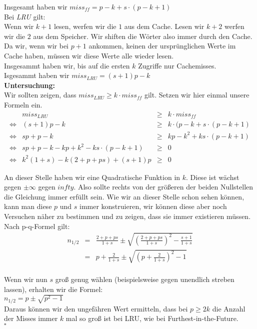 \documentclass[11pt,a4paper,ngerman]{article}
\begin{document}
\begin{enumerate}[\bfseries (a)]
Insgesamt haben wir $miss_{ff} = p - k + s \cdot (p - k + 1)$ \\

Bei \emph{LRU} gilt:\\
Wenn wir $k+1$ lesen, werfen wir die $1$ aus dem Cache. Lesen wir $k+2$ werfen wir die $2$ aus dem Speicher. Wir shiften die Wörter also immer durch den Cache. Da wir, wenn wir bei $p+1$ ankommen, keinen der ursprünglichen Werte im Cache haben, müssen wir diese Werte alle wieder lesen.\\
Insgesammt haben wir, bis auf die ersten $k$ Zugriffe nur Cachemisses.\\

Isgesammt haben wir $miss_{LRU} = (s+1)p - k$\\

\textbf{Untersuchung:}\\
Wir sollten zeigen, dass $miss_{LRU} \geq k \cdot miss_{ff}$ gilt. Setzen wir hier einmal unsere Formeln ein.
$$
\begin{array}{crcl}
& miss_{LRU} &\geq& k \cdot miss_{ff}\\
\Leftrightarrow & (s+1)p - k &\geq& k \cdot (p - k + s \cdot (p - k + 1)\\
\Leftrightarrow & sp + p - k &\geq&  kp - k^2 +ks \cdot (p - k + 1)\\
\Leftrightarrow & sp + p - k - kp + k^2 - ks \cdot ( p - k + 1) & \geq & 0\\
\Leftrightarrow & k^2 (1 + s) - k (2 + p + ps) +(s+1)p & \geq & 0
\end{array}
$$

An dieser Stelle haben wir eine Quadratische Funktion in $k$. Diese ist wächst gegen $\pm \infty$ gegen $infty$. Also sollte rechts von der größeren der beiden Nullstellen die Gleichung immer erfüllt sein. Wie wir an dieser Stelle schon sehen können, kann man diese $p$ und $s$ immer konstruieren, wir können diese aber noch Versuchen näher zu bestimmen und zu zeigen, dass sie immer existieren müssen.\\
Nach p-q-Formel gilt:\\

$$
\begin{array}{rcl}
n_{1/2} &=& \frac{2 + p + ps}{1 + s} \pm \sqrt{ \left( \frac{2 + p + ps}{1 + s} \right)^2 - \frac{s+1}{1+s}}\\
&=& p + \frac{2}{1 + s} \pm \sqrt{ \left( p + \frac{2}{1 + s} \right)^2 - 1}\\
\end{array}
$$

Wenn wir nun $s$ groß genug wählen (beispielsweise gegen unendlich streben lassen), erhalten wir die Formel:\\
$n_{1/2} = p \pm \sqrt{p^2 - 1}$\\

Daraus können wir den ungefähren Wert ermitteln, dass bei $p\geq 2k$ die Anzahl der Misses immer $k$ mal so groß ist bei LRU, wie bei Furthest-in-the-Future.\\
\mbox{} \hfill $\square$
\end{enumerate}
\end{document}
